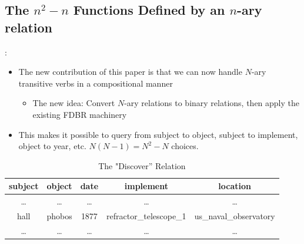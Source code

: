 \documentclass[logoontitle,tabu,supertabular,aspectratio=43]{preney-uwindsor-beamer}
\begin{document}
    \subsection{The $n^2 - n$ Functions Defined by an $n$-ary relation}
    \begin{frame}{\insertsection: \insertsubsection}
    \begin{itemize}
        \item The new contribution of this paper is that we can now handle $N$-ary transitive verbs in a compositional manner
        \begin{itemize}
            \item The new idea: Convert $N$-ary relations to binary relations, then apply the existing FDBR machinery
        \end{itemize}
        \item This makes it possible to query from subject to object, subject to implement, object to year, etc. $N(N -1) = N^2 - N$ choices.
    \end{itemize}
    \setlength{\tabcolsep}{0.4em} %
    \renewcommand{\arraystretch}{1}%
    \vspace{-1.5em}
    \begin{table}
        \caption{The "Discover'' Relation}
        \centering
        \begin{tabular}{  c c c c c  }
            \hline \hline
            subject & object & date & implement & location \\
            \hline
            \dots & \dots & \dots & \dots & \dots \\
            hall & phobos & 1877 & refractor\_telescope\_1 & us\_naval\_observatory \\
            \dots & \dots & \dots & \dots & \dots \\
            \hline \hline
        \end{tabular}
        \vspace{-1em}
        \label{tab:discover}
    \end{table}
\end{frame}
\end{document}
